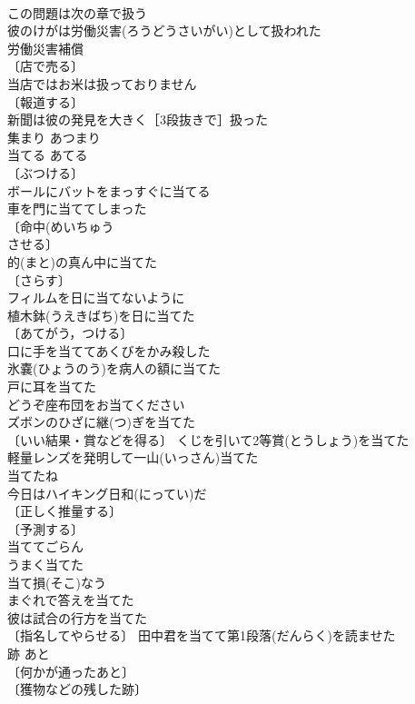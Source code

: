 \documentclass[8pt]{extreport}
\begin{document}
\begin{CJK}{UTF8}{min}
\\	この問題は次の章で扱う 
\\	彼のけがは労働災害(ろうどうさいがい)として扱われた 
\\	労働災害補償　
\\	〔店で売る〕 
\\	当店ではお米は扱っておりません 
\\	〔報道する〕
\\	新聞は彼の発見を大きく［3段抜きで］扱った 
\\	集まり	あつまり	
\\	当てる	あてる	
\\	〔ぶつける〕
\\	ボールにバットをまっすぐに当てる 
\\	車を門に当ててしまった 
\\	〔命中(めいちゅう　
\\	させる〕
\\	的(まと)の真ん中に当てた 
\\	〔さらす〕
\\	フィルムを日に当てないように 
\\	植木鉢(うえきばち)を日に当てた 
\\	〔あてがう，つける〕
\\	口に手を当ててあくびをかみ殺した 
\\	氷嚢(ひょうのう)を病人の額に当てた 
\\	戸に耳を当てた 
\\	どうぞ座布団をお当てください 
\\	ズボンのひざに継(つ)ぎを当てた 
\\	〔いい結果・賞などを得る〕 くじを引いて2等賞(とうしょう)を当てた 
\\	軽量レンズを発明して一山(いっさん)当てた 
\\	当てたね
\\	今日はハイキング日和(にってい)だ 
\\	〔正しく推量する〕
\\	〔予測する〕
\\	当ててごらん 
\\	うまく当てた 
\\	当て損(そこ)なう 
\\	まぐれで答えを当てた 
\\	彼は試合の行方を当てた 
\\	〔指名してやらせる〕 田中君を当てて第1段落(だんらく)を読ませた 
\\	跡	あと	
\\	〔何かが通ったあと〕
\\	〔獲物などの残した跡〕

\end{CJK}
\end{document}
